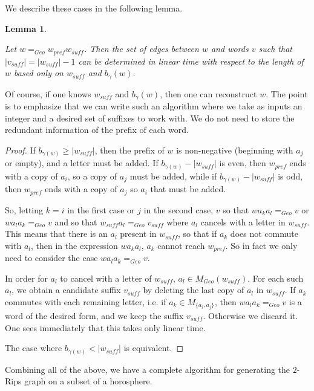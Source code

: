 \documentclass[10pt,a4paper]{amsart}
\newtheorem{lemma}[theorem]{Lemma}
\theoremstyle{definition}
\theoremstyle{remark}
\begin{document}
	We describe these cases in the following lemma.
	
	\begin{lemma} \label{RipsEdgesDifferentSuffixLength}
		
		Let $w=_{Geo}w_{pref}w_{suff}$. Then the set of edges between $w$ and words $v$ such that $|v_{suff}|=|w_{suff}|-1$ can be determined in linear time with respect to the length of $w$ based only on $w_{suff}$ and $b_{\gamma}(w)$.
		
	\end{lemma} 
	
	Of course, if one knows $w_{suff}$ and $b_{\gamma}(w)$, then one can reconstruct $w$. The point is to emphasize that we can write such an algorithm where we take as inputs an integer and a desired set of suffixes to work with. We do not need to store the redundant information of the prefix of each word.
	
	\begin{proof}
		
		If $b_{\gamma(w)}\ge|w_{suff}|$, then the prefix of $w$ is non-negative (beginning with $a_j$ or empty), and a letter must be added. If $b_{\gamma(w)}-|w_{suff}|$ is even, then $w_{pref}$ ends with a copy of $a_i$, so a copy of $a_j$ must be added, while if $b_{\gamma(w)}-|w_{suff}|$ is odd, then $w_{pref}$ ends with a copy of $a_j$ so $a_i$ that must be added.
		
		So, letting $k=i$ in the first case or $j$ in the second case, $v$ so that $wa_ka_l=_{Geo}v$ or $w a_l a_k=_{Geo}v$ and so that $w_{suff}a_l=_{Geo}v_{suff}$ where $a_l$ cancels with a letter in $w_{suff}$. This means that there is an $a_l$ present in $w_{suff}$, so that if $a_k$ does not commute with $a_l$, then in the expression $w a_ka_l$, $a_k$ cannot reach $w_{pref}$. So in fact we only need to consider the case $w a_l a_k=_{Geo}v$.
		
		In order for $a_l$ to cancel with a letter of $w_{suff}$, $a_l\in M_{Geo}(w_{suff})$. For each such $a_l$, we obtain a candidate suffix $v_{suff}$ by deleting the last copy of $a_l$ in $w_{suff}$. If $a_k$ commutes with each remaining letter, i.e. if $a_k\in M_{\{a_i, a_j\}}$, then $wa_la_k=_{Geo}v$ is a word of the desired form, and we keep the suffix $v_{suff}$. Otherwise we discard it. One sees immediately that this takes only linear time.
		
		The case where $b_{\gamma(w)}<|w_{suff}|$ is equivalent.
	\end{proof}
	
	Combining all of the above, we have a complete algorithm for generating the $2$-Rips graph on a subset of a horosphere.
	
\end{document}

